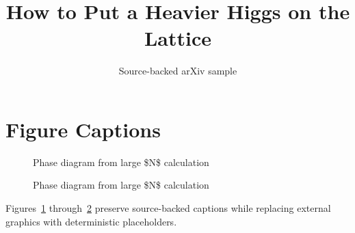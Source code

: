 \documentclass[11pt]{article}
\title{How to Put a Heavier Higgs on the Lattice}
\author{Source-backed arXiv sample}
\date{}
\begin{document}
\maketitle
\section{Figure Captions}

\begin{figure}[htbp]
\centering
\fbox{\rule{0pt}{1.15in}\rule{0.78\linewidth}{0pt}}
\caption{Phase diagram from large \$N\$ calculation}
\label{fig:source-1}
\end{figure}


\begin{figure}[htbp]
\centering
\fbox{\rule{0pt}{1.15in}\rule{0.78\linewidth}{0pt}}
\caption{Phase diagram from large \$N\$ calculation}
\label{fig:source-2}
\end{figure}


Figures~\ref{fig:source-1} through~\ref{fig:source-2} preserve source-backed captions while replacing external graphics with deterministic placeholders.
\end{document}
